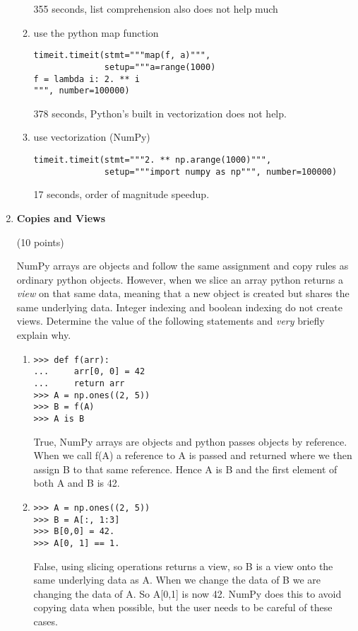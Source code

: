 \documentclass{article}
\newcounter{points}
\newcommand\setpoints[1]{\addtocounter{points}{#1}(#1 points)}
\begin{document}
\begin{enumerate}
\begin{enumerate}
355 seconds, list comprehension also does not help much

\item use the python map function
\begin{verbatim}
timeit.timeit(stmt="""map(f, a)""", 
              setup="""a=range(1000)
f = lambda i: 2. ** i
""", number=100000)
\end{verbatim}
378 seconds, Python's built in vectorization does not help. 


\item use vectorization (NumPy)

\begin{verbatim}
timeit.timeit(stmt="""2. ** np.arange(1000)""", 
              setup="""import numpy as np""", number=100000)
\end{verbatim}
17 seconds, order of magnitude speedup.
\end{enumerate}

\item \textbf{Copies and Views} \setpoints{10}

NumPy arrays are objects and follow the same assignment and copy rules as ordinary python objects. However, when we slice an array python returns a \textit{view} on that same data, meaning that a new object is created but shares the same underlying data. Integer indexing and boolean indexing do not create views. Determine the value of the following statements and \textit{very }briefly explain why. 
\begin{enumerate}


\item  

\begin{verbatim}
>>> def f(arr):
...     arr[0, 0] = 42
...     return arr
>>> A = np.ones((2, 5))
>>> B = f(A)
>>> A is B
\end{verbatim}
True, NumPy arrays are objects and python passes objects by reference. When we call f(A) a reference to A is passed and returned where we then assign B to that same reference. Hence A is B and the first element of both A and B is 42.
\item  

\begin{verbatim}
>>> A = np.ones((2, 5))
>>> B = A[:, 1:3]
>>> B[0,0] = 42.
>>> A[0, 1] == 1.
\end{verbatim}
False, using slicing operations returns a view, so B is a view onto the same underlying data as A. When we change the data of B we are changing the data of A. So A[0,1] is now 42. NumPy does this to avoid copying data when possible, but the user needs to be careful of these cases.



\end{enumerate}
\end{enumerate}
\end{document}
